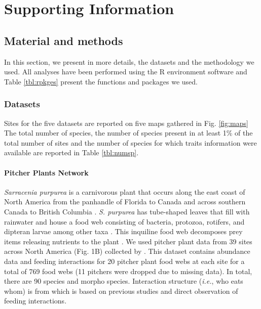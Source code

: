 \section{Supporting Information}\label{supporting-information}

\label{chap3si}

\subsection{Material and methods}\label{material-and-methods-1}

In this section, we present in more details, the datasets and the
methodology we used. All analyses have been performed using the R
environment software and Table \ref{tbl:rpkges} present the functions
and packages we used.

\subsubsection{Datasets}\label{datasets-1}

Sites for the five datasets are reported on five maps gathered in Fig.
\ref{fig:maps} The total number of species, the number of species
present in at least 1\% of the total number of sites and the number of
species for which traits information were available are reported in
Table \ref{tbl:numsp}.

\paragraph{Pitcher Plants Network}\label{pitcher-plants-network}

\emph{Sarracenia purpurea} is a carnivorous plant that occurs along the
east coast of North America from the panhandle of Florida to Canada and
across southern Canada to British Columbia \citep{Buckley2010}. \emph{S.
purpurea} has tube-shaped leaves that fill with rainwater and house a
food web consisting of bacteria, protozoa, rotifers, and dipteran larvae
among other taxa \citep{Addicott1974, Buckley2010}. This inquiline food
web decomposes prey items releasing nutrients to the plant
\citep{Mouquet2008, Baiser2011}. We used pitcher plant data from 39
sites across North America (Fig. 1B) collected by \citet{Buckley2010}.
This dataset contains abundance data and feeding interactions for 20
pitcher plant food webs at each site for a total of 769 food webs (11
pitchers were dropped due to missing data). In total, there are 90
species and morpho species. Interaction structure (\emph{i.e.}, who eats
whom) is from \citet{Baiser2012} which is based on previous studies
\citep[\emph{e.g.},][\citet{Butler008}]{Addicott1974, Miller2002} and
direct observation of feeding interactions.

